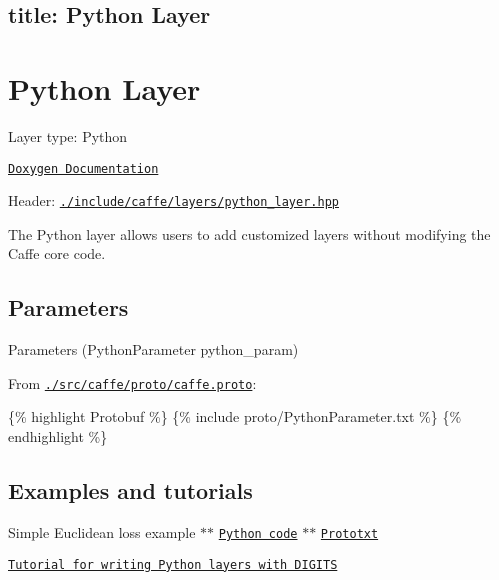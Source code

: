 

 \subsection*{title\+: Python Layer }

\section*{Python Layer}


\begin{DoxyItemize}
\item Layer type\+: {\ttfamily Python}
\item \href{http://caffe.berkeleyvision.org/doxygen/classcaffe_1_1PythonLayer.html}{\tt Doxygen Documentation}
\item Header\+: \href{https://github.com/BVLC/caffe/blob/master/include/caffe/layers/python_layer.hpp}{\tt {\ttfamily ./include/caffe/layers/python\+\_\+layer.hpp}}
\end{DoxyItemize}

The Python layer allows users to add customized layers without modifying the Caffe core code.

\subsection*{Parameters}


\begin{DoxyItemize}
\item Parameters ({\ttfamily Python\+Parameter python\+\_\+param})
\item From \href{https://github.com/BVLC/caffe/blob/master/src/caffe/proto/caffe.proto}{\tt {\ttfamily ./src/caffe/proto/caffe.proto}}\+:
\end{DoxyItemize}

\{\% highlight Protobuf \%\} \{\% include proto/\+Python\+Parameter.\+txt \%\} \{\% endhighlight \%\}

\subsection*{Examples and tutorials}


\begin{DoxyItemize}
\item Simple Euclidean loss example $\ast$$\ast$ \href{https://github.com/BVLC/caffe/blob/master/examples/pycaffe/layers/pyloss.py}{\tt Python code} $\ast$$\ast$ \href{https://github.com/BVLC/caffe/blob/master/examples/pycaffe/linreg.prototxt}{\tt Prototxt}
\item \href{https://github.com/NVIDIA/DIGITS/tree/master/examples/python-layer}{\tt Tutorial for writing Python layers with D\+I\+G\+I\+TS} 
\end{DoxyItemize}